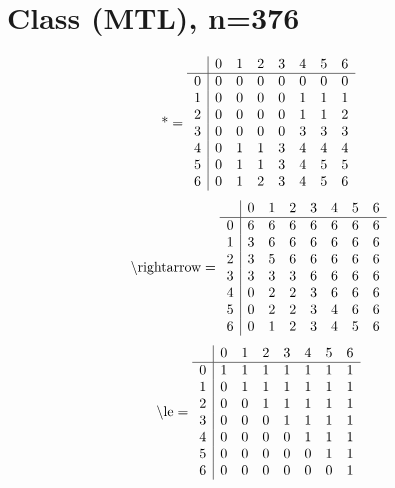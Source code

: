 \documentclass[11pt]{article}
\begin{document}
\section{Class (MTL), n=376}
\[\text{*} = 
\begin{array}{r | r r r r r r r}
 & 0 & 1 & 2 & 3 & 4 & 5 & 6 \\ \hline
0 & 0 & 0 & 0 & 0 & 0 & 0 & 0 \\
1 & 0 & 0 & 0 & 0 & 1 & 1 & 1 \\
2 & 0 & 0 & 0 & 0 & 1 & 1 & 2 \\
3 & 0 & 0 & 0 & 0 & 3 & 3 & 3 \\
4 & 0 & 1 & 1 & 3 & 4 & 4 & 4 \\
5 & 0 & 1 & 1 & 3 & 4 & 5 & 5 \\
6 & 0 & 1 & 2 & 3 & 4 & 5 & 6 \\
\end{array}
\]
\[\text{\textbackslash rightarrow} = 
\begin{array}{r | r r r r r r r}
 & 0 & 1 & 2 & 3 & 4 & 5 & 6 \\ \hline
0 & 6 & 6 & 6 & 6 & 6 & 6 & 6 \\
1 & 3 & 6 & 6 & 6 & 6 & 6 & 6 \\
2 & 3 & 5 & 6 & 6 & 6 & 6 & 6 \\
3 & 3 & 3 & 3 & 6 & 6 & 6 & 6 \\
4 & 0 & 2 & 2 & 3 & 6 & 6 & 6 \\
5 & 0 & 2 & 2 & 3 & 4 & 6 & 6 \\
6 & 0 & 1 & 2 & 3 & 4 & 5 & 6 \\
\end{array}
\]
\[\text{\textbackslash le} = 
\begin{array}{r | r r r r r r r}
 & 0 & 1 & 2 & 3 & 4 & 5 & 6 \\ \hline
0 & 1 & 1 & 1 & 1 & 1 & 1 & 1 \\
1 & 0 & 1 & 1 & 1 & 1 & 1 & 1 \\
2 & 0 & 0 & 1 & 1 & 1 & 1 & 1 \\
3 & 0 & 0 & 0 & 1 & 1 & 1 & 1 \\
4 & 0 & 0 & 0 & 0 & 1 & 1 & 1 \\
5 & 0 & 0 & 0 & 0 & 0 & 1 & 1 \\
6 & 0 & 0 & 0 & 0 & 0 & 0 & 1 \\
\end{array}
\]
\end{document}
